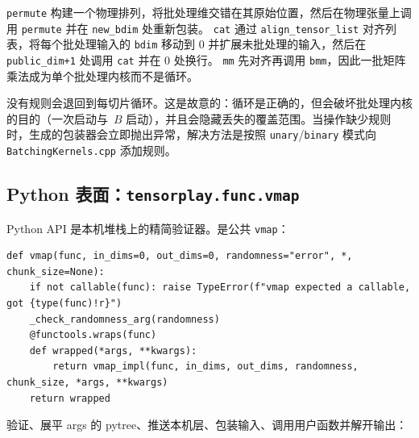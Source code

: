 \texttt{permute} 构建一个物理排列，将批处理维交错在其原始位置，然后在物理张量上调用 \texttt{permute} 并在 \texttt{new\_bdim} 处重新包装。 \texttt{cat} 通过 \texttt{align\_tensor\_list} 对齐列表，将每个批处理输入的 \texttt{bdim} 移动到 0 并扩展未批处理的输入，然后在 \texttt{public\_dim+1} 处调用 \texttt{cat} 并在 0 处换行。 \texttt{mm} 先对齐再调用 \texttt{bmm}，因此一批矩阵乘法成为单个批处理内核而不是循环。

没有规则会退回到每切片循环。这是故意的：循环是正确的，但会破坏批处理内核的目的（一次启动与\ $B$ 启动），并且会隐藏丢失的覆盖范围。当操作缺少规则时，生成的包装器会立即抛出异常，解决方法是按照 \texttt{unary}/\texttt{binary} 模式向 \texttt{BatchingKernels.cpp} 添加规则。

\subsection{Python 表面：\texttt{tensorplay.func.vmap}}
\label{sec:pythonsurface}

Python API 是本机堆栈上的精简验证器。是公共 \texttt{vmap}：

\begin{lstlisting}[caption={public \texttt{vmap} surface.}, label=lst:pyvmapapi, style=pystyle]
def vmap(func, in_dims=0, out_dims=0, randomness="error", *, chunk_size=None):
    if not callable(func): raise TypeError(f"vmap expected a callable, got {type(func)!r}")
    _check_randomness_arg(randomness)
    @functools.wraps(func)
    def wrapped(*args, **kwargs):
        return vmap_impl(func, in_dims, out_dims, randomness, chunk_size, *args, **kwargs)
    return wrapped
\end{lstlisting}

验证、展平 args 的 pytree、推送本机层、包装输入、调用用户函数并解开输出：

